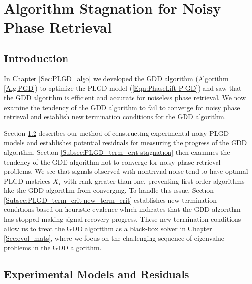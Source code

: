 \chapter{Algorithm Stagnation for Noisy Phase Retrieval}  \label{Sec:PLGD_term_crit}



\section{Introduction}	\label{Subsec:PLGD_term_crit-intro}


In Chapter \ref{Sec:PLGD_algo} we developed the GDD algorithm (Algorithm \ref{Alg:PGD}) to optimize the PLGD model (\ref{Eqn:PhaseLift-P-GD}) and saw that the GDD algorithm is efficient and accurate for noiseless phase retrieval.  
We now examine the tendency of the GDD algorithm to fail to converge for noisy phase retrieval and establish new termination conditions for the GDD algorithm.

Section \ref{Subsec:PLGD_term_crit-NOISY_MODELS_AND_RESIDUALS} describes our method of constructing experimental noisy PLGD models and establishes potential residuals for measuring the progress of the GDD algorithm.
Section \ref{Subsec:PLGD_term_crit-stagnation} then examines the tendency of the GDD algorithm not to converge for noisy phase retrieval problems.
We see that signals observed with nontrivial noise tend to have optimal PLGD matrices $X_\star$ with rank greater than one, preventing first-order algorithms like the GDD algorithm from converging.  
To handle this issue, Section \ref{Subsec:PLGD_term_crit-new_term_crit} establishes new termination conditions based on heuristic evidence which indicates that the GDD algorithm has stopped making signal recovery progress.  
These new termination conditions allow us to treat the GDD algorithm as a black-box solver in Chapter \ref{Sec:evol_mats}, where we focus on the challenging sequence of eigenvalue problems in the GDD algorithm.





\section{Experimental Models and Residuals} 		\label{Subsec:PLGD_term_crit-NOISY_MODELS_AND_RESIDUALS}



